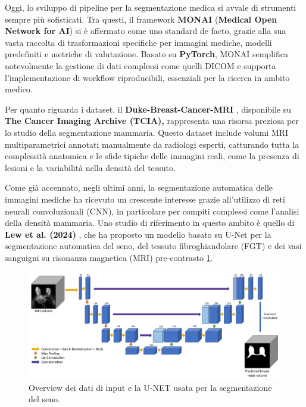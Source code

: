 Oggi, lo sviluppo di pipeline per la segmentazione medica si avvale di strumenti sempre più sofisticati. Tra questi, il framework \textbf{MONAI} (\textbf{Medical Open Network for AI}) si è affermato come uno standard de facto, grazie alla sua vasta raccolta di trasformazioni specifiche per immagini mediche, modelli predefiniti e metriche di valutazione. Basato su \textbf{PyTorch}, MONAI semplifica notevolmente la gestione di dati complessi come quelli DICOM e supporta l’implementazione di workflow riproducibili, essenziali per la ricerca in ambito medico.

Per quanto riguarda i dataset, il \textbf{Duke-Breast-Cancer-MRI} \cite{duke_breast_mri}, disponibile su \textbf{The Cancer Imaging Archive (TCIA),} rappresenta una risorsa preziosa per lo studio della segmentazione mammaria. Questo dataset include volumi MRI multiparametrici annotati manualmente da radiologi esperti, catturando tutta la complessità anatomica e le sfide tipiche delle immagini reali, come la presenza di lesioni e la variabilità nella densità del tessuto.


Come già accennato, negli ultimi anni, la segmentazione automatica delle immagini mediche ha ricevuto un crescente interesse grazie all’utilizzo di reti neurali convoluzionali (CNN), in particolare per compiti complessi come l’analisi della densità mammaria. Uno studio di riferimento in questo ambito è quello di \textbf{Lew et al. (2024)} \cite{lew2024segmentation}, che ha proposto un modello basato su U-Net per la segmentazione automatica del seno, del tessuto fibroghiandolare (FGT) e dei vasi sanguigni su risonanza magnetica (MRI) pre-contrasto \ref{fig:schema_segmentazione_seno_paper}.

\begin{figure}[H] 
  	\centering 
 	\includegraphics[width=\textwidth]{images/2025-07-07-12-01-04.png} 
	 \caption{Overview dei dati di input e la U-NET usata per la segmentazione del seno.}
    \label{fig:schema_segmentazione_seno_paper}
 \end{figure} 


